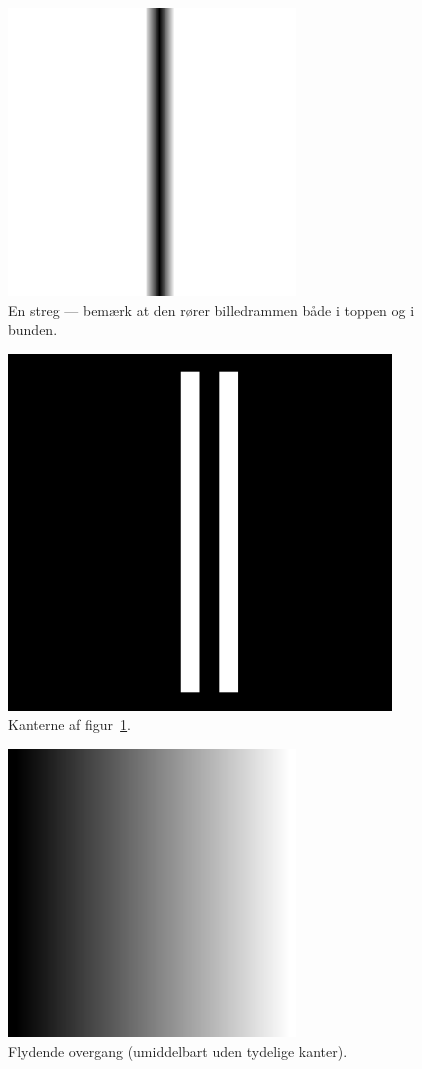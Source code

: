 \documentclass{article}
\begin{document}
	\begin{figure}
		\centering
		\includegraphics[width=3in]{test1.png}
		\caption{En streg --- bemærk at den rører billedrammen både i toppen og i bunden.}
		\label{ke1}
	\end{figure}
	\begin{figure}
		\centering
		\includegraphics[width=4in]{test1_result.png}
		\caption{Kanterne af figur~\ref{ke1}.}
		\label{ke1r}
	\end{figure}
	\begin{figure}
		\centering
		\includegraphics[width=3in]{test2.png}
		\caption{Flydende overgang (umiddelbart uden tydelige kanter).}
		\label{ke2}
	\end{figure}
\end{document}
